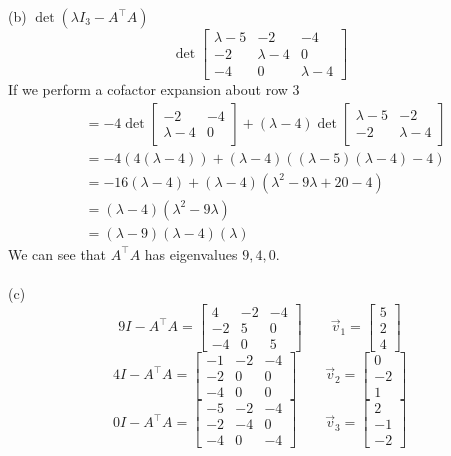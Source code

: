 \documentclass{report}
\begin{document}
(b) $\det(\lambda I_3 - A^\top A)$
$$
\det\begin{bmatrix}
\lambda-5&-2&-4\\
-2&\lambda-4&0\\
-4&0&\lambda-4
\end{bmatrix}
$$
If we perform a cofactor expansion about row 3
$$
\begin{aligned}
&=-4\det\begin{bmatrix}-2&-4\\\lambda-4&0\end{bmatrix} + (\lambda-4)\det\begin{bmatrix}\lambda-5&-2\\-2&\lambda-4\end{bmatrix}\\
&=-4(4(\lambda-4))+(\lambda-4)((\lambda-5)(\lambda-4)-4)\\
&=-16(\lambda-4)+(\lambda-4)(\lambda^2-9\lambda+20-4)\\
&=(\lambda-4)(\lambda^2-9\lambda)\\
&=(\lambda-9)(\lambda-4)(\lambda)
\end{aligned}
$$
We can see that $A^\top A$ has eigenvalues $9, 4, 0$. \\
\\
\noindent
(c)
$$
9I - A^\top A = \begin{bmatrix}
4&-2&-4\\
-2&5&0\\
-4&0&5
\end{bmatrix}\qquad\vec{v}_1 = \begin{bmatrix}5\\2\\4\end{bmatrix}
$$
$$
4I-A^\top A = \begin{bmatrix}
-1&-2&-4\\
-2&0&0\\
-4&0&0
\end{bmatrix}\qquad\vec{v}_2 = \begin{bmatrix}0\\-2\\1\end{bmatrix}
$$
$$
0I-A^\top A = \begin{bmatrix}
-5&-2&-4\\
-2&-4&0\\
-4&0&-4
\end{bmatrix}\qquad\vec{v}_3 = \begin{bmatrix}2\\-1\\-2\end{bmatrix}
$$
\end{document}
